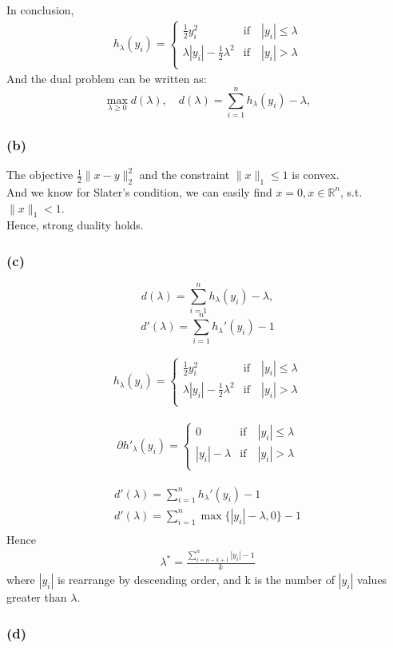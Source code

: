 \documentclass[12pt]{article}
\newcommand{\R}{\mathbb{R}}
\begin{document}
In conclusion,
\begin{align*}
    h_{\lambda}(y_i) = \begin{cases}
        \frac{1}{2} y_i^2 &\text{if} \quad |y_i| \leq \lambda \\
        \lambda|y_i| - \frac{1}{2} \lambda^2 &\text{if} \quad |y_i| > \lambda \\
    \end{cases}
\end{align*}
And the dual problem can be written as:
\[\max_{\lambda\geq 0} d(\lambda), \quad d(\lambda) = \sum_{i=1}^n h_\lambda(y_i) - \lambda,\]


\subsubsection{(b)}
The objective \(\frac{1}{2} \|x - y\|_2^2\) and the constraint \(\|x\|_1 \leq 1\) is convex. \\
And we know for Slater's condition, we can easily find \(x = 0, x \in \R^n\), s.t. \(\|x\|_1 < 1\). \\
Hence, strong duality holds.

\subsubsection{(c)}
\[d(\lambda) = \sum_{i=1}^n h_\lambda(y_i) - \lambda,\]
\[d'(\lambda) = \sum_{i=1}^{n} h_\lambda'(y_i) - 1\]

\begin{align*}
    h_{\lambda}(y_i) = \begin{cases}
        \frac{1}{2} y_i^2 &\text{if} \quad |y_i| \leq \lambda \\
        \lambda|y_i| - \frac{1}{2} \lambda^2 &\text{if} \quad |y_i| > \lambda \\
    \end{cases}
\end{align*}

\begin{align*}
    \partial h'_{\lambda}(y_i) = \begin{cases}
        0 &\text{if} \quad |y_i| \leq \lambda \\
        |y_i| - \lambda  &\text{if} \quad |y_i| > \lambda \\
    \end{cases}
\end{align*}

\begin{align*}
    d'(\lambda) = \sum_{i=1}^{n} h_\lambda'(y_i) - 1 \\
    d'(\lambda) = \sum_{i=1}^{n} \max\{|y_i| - \lambda, 0\} - 1 \\
\end{align*}
Hence
\begin{align*}
    \lambda^* = \frac{\sum_{i=n-k+1}^{n}|y_{i}| - 1}{k}
\end{align*}
where \(|y_i|\) is rearrange by descending order, and k is the number of \(|y_i|\) values greater than \(\lambda\).

\subsubsection{(d)}
\end{document}

